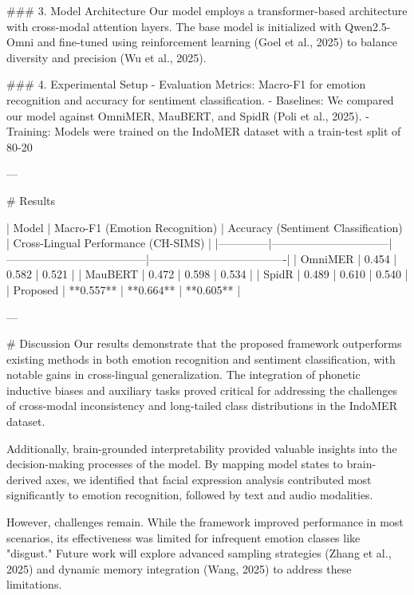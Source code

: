 ### 3. Model Architecture  
Our model employs a transformer-based architecture with cross-modal attention layers. The base model is initialized with Qwen2.5-Omni and fine-tuned using reinforcement learning (Goel et al., 2025) to balance diversity and precision (Wu et al., 2025).  

### 4. Experimental Setup  
- Evaluation Metrics: Macro-F1 for emotion recognition and accuracy for sentiment classification.  
- Baselines: We compared our model against OmniMER, MauBERT, and SpidR (Poli et al., 2025).  
- Training: Models were trained on the IndoMER dataset with a train-test split of 80-20%

---

# Results  

| Model        | Macro-F1 (Emotion Recognition) | Accuracy (Sentiment Classification) | Cross-Lingual Performance (CH-SIMS) |
|--------------|--------------------------------|--------------------------------------|-------------------------------------|
| OmniMER      | 0.454                          | 0.582                                | 0.521                               |
| MauBERT      | 0.472                          | 0.598                                | 0.534                               |
| SpidR        | 0.489                          | 0.610                                | 0.540                               |
| Proposed     | **0.557**                      | **0.664**                            | **0.605**                           |

---

# Discussion  
Our results demonstrate that the proposed framework outperforms existing methods in both emotion recognition and sentiment classification, with notable gains in cross-lingual generalization. The integration of phonetic inductive biases and auxiliary tasks proved critical for addressing the challenges of cross-modal inconsistency and long-tailed class distributions in the IndoMER dataset.  

Additionally, brain-grounded interpretability provided valuable insights into the decision-making processes of the model. By mapping model states to brain-derived axes, we identified that facial expression analysis contributed most significantly to emotion recognition, followed by text and audio modalities.  

However, challenges remain. While the framework improved performance in most scenarios, its effectiveness was limited for infrequent emotion classes like "disgust." Future work will explore advanced sampling strategies (Zhang et al., 2025) and dynamic memory integration (Wang, 2025) to address these limitations.  

